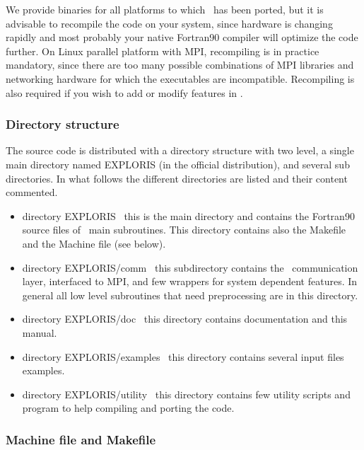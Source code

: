 We provide binaries for all
platforms to which \PDAC\ has been ported, but it is 
advisable to recompile the code on your system, 
since hardware is changing rapidly and most probably 
your native Fortran90 compiler will optimize
the code further. 
On Linux parallel platform with MPI, recompiling 
is in practice mandatory, since there are too
many possible combinations of MPI libraries and networking
hardware for which the executables are incompatible.
Recompiling is also required if you wish  
to add or modify features in \PDAC.

\subsubsection{Directory structure}

The \PDAC source code is distributed with a 
directory structure with two level, a single
main directory named EXPLORIS (in the official distribution), 
and several sub directories.
In what follows the different directories are listed
and their content commented.

\begin{itemize}

\item directory EXPLORIS \
      this is the main directory and contains the Fortran90 source files
      of \PDAC\ main subroutines. This directory contains also the 
      Makefile and the Machine file (see below).

\item directory EXPLORIS/comm \
      this subdirectory contains the \PDAC\ communication layer,
      interfaced to MPI, and few wrappers for system dependent
      features. In general all low level subroutines that 
      need preprocessing are in this directory.

\item directory EXPLORIS/doc \
      this directory contains \PDAC documentation and this manual.

\item directory EXPLORIS/examples \
      this directory contains several input files examples.
      
\item directory EXPLORIS/utility \
      this directory contains few utility scripts and program
      to help compiling and porting the code.

\end{itemize}

\subsubsection{ Machine file and Makefile}

